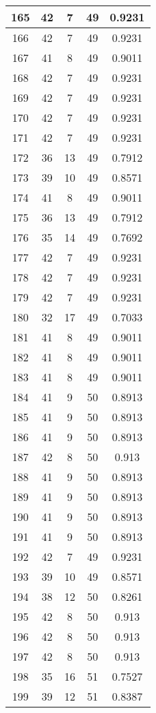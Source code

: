 \documentclass[letterpaper, 12pt]{article}
\begin{document}
\begin{longtable}{|c|c|c|c|c|}
\hline
165 & 42 & 7 & 49 & 0.9231 \\
\hline
166 & 42 & 7 & 49 & 0.9231 \\
\hline
167 & 41 & 8 & 49 & 0.9011 \\
\hline
168 & 42 & 7 & 49 & 0.9231 \\
\hline
169 & 42 & 7 & 49 & 0.9231 \\
\hline
170 & 42 & 7 & 49 & 0.9231 \\
\hline
171 & 42 & 7 & 49 & 0.9231 \\
\hline
172 & 36 & 13 & 49 & 0.7912 \\
\hline
173 & 39 & 10 & 49 & 0.8571 \\
\hline
174 & 41 & 8 & 49 & 0.9011 \\
\hline
175 & 36 & 13 & 49 & 0.7912 \\
\hline
176 & 35 & 14 & 49 & 0.7692 \\
\hline
177 & 42 & 7 & 49 & 0.9231 \\
\hline
178 & 42 & 7 & 49 & 0.9231 \\
\hline
179 & 42 & 7 & 49 & 0.9231 \\
\hline
180 & 32 & 17 & 49 & 0.7033 \\
\hline
181 & 41 & 8 & 49 & 0.9011 \\
\hline
182 & 41 & 8 & 49 & 0.9011 \\
\hline
183 & 41 & 8 & 49 & 0.9011 \\
\hline
184 & 41 & 9 & 50 & 0.8913 \\
\hline
185 & 41 & 9 & 50 & 0.8913 \\
\hline
186 & 41 & 9 & 50 & 0.8913 \\
\hline
187 & 42 & 8 & 50 & 0.913 \\
\hline
188 & 41 & 9 & 50 & 0.8913 \\
\hline
189 & 41 & 9 & 50 & 0.8913 \\
\hline
190 & 41 & 9 & 50 & 0.8913 \\
\hline
191 & 41 & 9 & 50 & 0.8913 \\
\hline
192 & 42 & 7 & 49 & 0.9231 \\
\hline
193 & 39 & 10 & 49 & 0.8571 \\
\hline
194 & 38 & 12 & 50 & 0.8261 \\
\hline
195 & 42 & 8 & 50 & 0.913 \\
\hline
196 & 42 & 8 & 50 & 0.913 \\
\hline
197 & 42 & 8 & 50 & 0.913 \\
\hline
198 & 35 & 16 & 51 & 0.7527 \\
\hline
199 & 39 & 12 & 51 & 0.8387 \\
\hline
\end{longtable}
\end{document}
